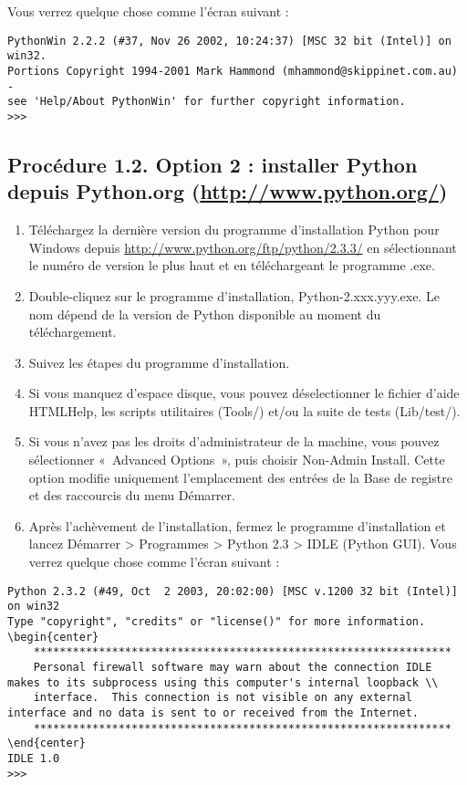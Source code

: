 Vous verrez quelque chose comme l'écran suivant :

\begin{lstlisting}
PythonWin 2.2.2 (#37, Nov 26 2002, 10:24:37) [MSC 32 bit (Intel)] on win32.
Portions Copyright 1994-2001 Mark Hammond (mhammond@skippinet.com.au) -
see 'Help/About PythonWin' for further copyright information.
>>>
\end{lstlisting}

\subsection*{Procédure 1.2. Option 2 : installer Python depuis Python.org (\url{http://www.python.org/})}

\begin{enumerate}
    \item Téléchargez la dernière version du programme d'installation Python pour Windows depuis \url{http://www.python.org/ftp/python/2.3.3/} en sélectionnant le numéro de version le plus haut et en téléchargeant le programme .exe.
    \item  Double-cliquez sur le programme d'installation, Python-2.xxx.yyy.exe. Le nom dépend de la version de Python disponible au moment du téléchargement.
    \item Suivez les étapes du programme d'installation.
    \item  Si vous manquez d'espace disque, vous pouvez déselectionner le fichier d'aide HTMLHelp, les scripts utilitaires (Tools/) et/ou la suite de tests (Lib/test/).
    \item Si vous n'avez pas les droits d'administrateur de la machine, vous pouvez sélectionner «~Advanced Options~», puis choisir Non-Admin Install. Cette option modifie uniquement l'emplacement des entrées de la Base de registre et des raccourcis du menu Démarrer.
    \item Après l'achèvement de l'installation, fermez le programme d'installation et lancez Démarrer > Programmes > Python 2.3 > IDLE (Python GUI). Vous verrez quelque chose comme l'écran suivant :
\end{enumerate}

\begin{lstlisting}
Python 2.3.2 (#49, Oct  2 2003, 20:02:00) [MSC v.1200 32 bit (Intel)] on win32
Type "copyright", "credits" or "license()" for more information.
\begin{center}
    ****************************************************************
    Personal firewall software may warn about the connection IDLE makes to its subprocess using this computer's internal loopback \\
    interface.  This connection is not visible on any external interface and no data is sent to or received from the Internet.
    ****************************************************************
\end{center}
IDLE 1.0
>>>
\end{lstlisting}


